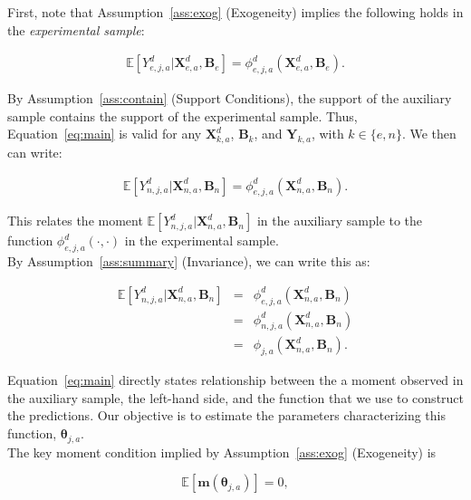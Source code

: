 \noindent First, note that Assumption~\ref{ass:exog} (Exogeneity) implies the following holds in the \textit{experimental sample}: 

\begin{eqnarray}
\mathbb{E} \left[ Y_{e,j,a}^d | \bm{X}_{e,a}^d, \bm{B}_{e} \right] =  \phi^d_{e,j,a}\left( \bm{X}_{e,a}^d, \bm{B}_{e} \right). \label{eq:main}
\end{eqnarray}

\noindent By Assumption~\ref{ass:contain} (Support Conditions), the support of the auxiliary sample contains the support of the experimental sample. Thus, Equation~\eqref{eq:main} is valid for any $\bm{X}^d_{k,a}$, $\bm{B}_{k}$, and $\bm{Y}_{k,a}$, with $k \in \{ e, n\}$. We then can write: 

\begin{eqnarray}
\mathbb{E} \left[ Y_{n,j,a}^d | \bm{X}_{n,a}^d, \bm{B}_{n} \right] =  \phi^d_{e,j,a}\left( \bm{X}_{n,a}^d, \bm{B}_{n} \right).
\end{eqnarray}

\noindent This relates the moment $\mathbb{E} \left[ Y_{n,j,a}^d | \bm{X}_{n,a}^d, \bm{B}_{n} \right]$ in the auxiliary sample to the function  $\phi^d_{e,j,a}\left( \cdot, \cdot \right)$ in the experimental sample.\\

\noindent By Assumption~\ref{ass:summary} (Invariance), we can write this as: 

\begin{eqnarray}
\mathbb{E} \left[ Y_{n,j,a}^d | \bm{X}_{n,a}^d, \bm{B}_{n} \right] &=&  \phi^d_{e,j,a}\left( \bm{X}_{n,a}^d, \bm{B}_{n} \right) \nonumber \\ 
 &=&  \phi^d_{n,j,a}\left( \bm{X}_{n,a}^d, \bm{B}_{n} \right) \nonumber \\
 &=&  \phi_{j,a}\left( \bm{X}_{n,a}^d, \bm{B}_{n} \right). \label{eq:mainpred}
\end{eqnarray}

\noindent Equation~\eqref{eq:main} directly states relationship between the a moment observed in the auxiliary sample, the left-hand side, and the function that we use to construct the predictions. Our objective is to estimate the parameters characterizing this function, $\bm{\theta}_{j,a}$.\\ 

\noindent The key moment condition implied by Assumption~\ref{ass:exog} (Exogeneity) is 

\begin{equation}
\mathbb{E} \left[ \bm{m} \left( \bm{\theta}_{j,a} \right) \right] = 0, \label{eq:moment}
\end{equation}

